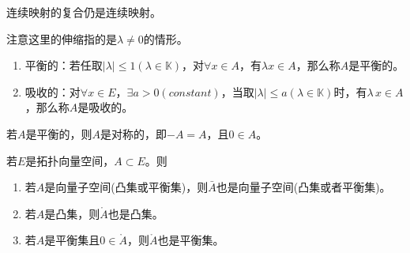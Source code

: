 \begin{hint}
	连续映射的复合仍是连续映射。
\end{hint}

\begin{remark}
	注意这里的伸缩指的是$\lambda \neq 0 $的情形。
\end{remark}

\begin{definition}
	\begin{enumerate}
		\item 平衡的：若任取$|\lambda|\leq 1(\lambda\in \mathbb{K}) $，对$\forall x\in A$，有$\lambda x\in A $，那么称$A$是平衡的。
		\item 吸收的：对$\forall x\in E $，$\exists a>0 (constant)$，当取$|\lambda|\leq a(\lambda \in \mathbb{K})$时，有$\lambda \, x\in A$，那么称$A$是吸收的。
	\end{enumerate}
\end{definition}

\begin{remark}
	若$A$是平衡的，则$A$是对称的，即$-A=A$，且$0\in A$。
\end{remark}

\begin{theorem}
	若$E$是拓扑向量空间，$A\subset E$。则
	\begin{enumerate}
		\item 若$A$是向量子空间(凸集或平衡集)，则$\bar{A}$也是向量子空间(凸集或者平衡集)。
		\item 若$A$是凸集，则$\mathring{A}$也是凸集。
		\item 若$A$是平衡集且$0\in \mathring{A} $，则$\mathring{A}$也是平衡集。
	\end{enumerate}
\end{theorem}

